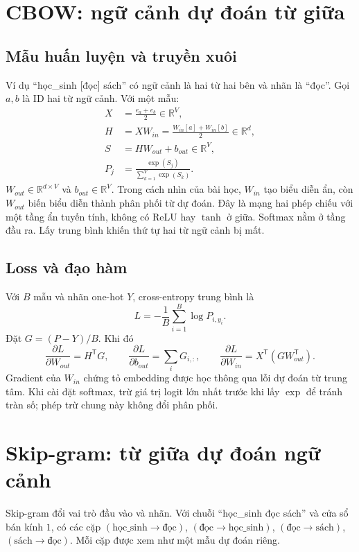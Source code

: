\documentclass[12pt,a4paper]{article}
\begin{document}
\section{CBOW: ngữ cảnh dự đoán từ giữa}
\subsection{Mẫu huấn luyện và truyền xuôi}
Ví dụ ``học\_sinh [đọc] sách'' có ngữ cảnh là hai từ hai bên và nhãn là ``đọc''. Gọi $a,b$ là ID hai từ ngữ cảnh. Với một mẫu:
\begin{align}
X&=\frac{e_a+e_b}{2}\in\mathbb R^V,\\
H&=XW_{in}=\frac{W_{in}[a]+W_{in}[b]}{2}\in\mathbb R^d,\\
S&=HW_{out}+b_{out}\in\mathbb R^V,\\
P_j&=\frac{\exp(S_j)}{\sum_{k=1}^V\exp(S_k)}.
\end{align}
$W_{out}\in\mathbb R^{d\times V}$ và $b_{out}\in\mathbb R^V$. Trong cách nhìn của bài học, $W_{in}$ tạo biểu diễn ẩn, còn $W_{out}$ biến biểu diễn thành phân phối từ dự đoán. Đây là mạng hai phép chiếu với một tầng ẩn tuyến tính, không có ReLU hay $\tanh$ ở giữa. Softmax nằm ở tầng đầu ra. Lấy trung bình khiến thứ tự hai từ ngữ cảnh bị mất.

\subsection{Loss và đạo hàm}
Với $B$ mẫu và nhãn one-hot $Y$, cross-entropy trung bình là
\begin{equation}
L=-\frac1B\sum_{i=1}^{B}\log P_{i,y_i}.
\end{equation}
Đặt $G=(P-Y)/B$. Khi đó
\begin{equation}
\frac{\partial L}{\partial W_{out}}=H^{\mathsf T}G,\qquad
\frac{\partial L}{\partial b_{out}}=\sum_i G_{i,:},\qquad
\frac{\partial L}{\partial W_{in}}=X^{\mathsf T}(GW_{out}^{\mathsf T}).
\end{equation}
Gradient của $W_{in}$ chứng tỏ embedding được học thông qua lỗi dự đoán từ trung tâm. Khi cài đặt softmax, trừ giá trị logit lớn nhất trước khi lấy $\exp$ để tránh tràn số; phép trừ chung này không đổi phân phối.

\section{Skip-gram: từ giữa dự đoán ngữ cảnh}
Skip-gram đổi vai trò đầu vào và nhãn. Với chuỗi ``học\_sinh đọc sách'' và cửa sổ bán kính $1$, có các cặp $(\text{học\_sinh}\to\text{đọc})$, $(\text{đọc}\to\text{học\_sinh})$, $(\text{đọc}\to\text{sách})$, $(\text{sách}\to\text{đọc})$. Mỗi cặp được xem như một mẫu dự đoán riêng.
\end{document}
